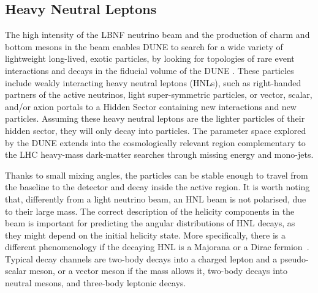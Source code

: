 \subsection{Heavy Neutral Leptons}
The high intensity of the LBNF neutrino beam and the production of charm and bottom mesons in the beam enables DUNE to search for a wide variety of lightweight long-lived, exotic particles, by looking for topologies of rare event interactions and decays in the fiducial volume of the DUNE . These particles include weakly interacting heavy neutral leptons (HNLs), such as right-handed partners of the active neutrinos, light super-symmetric particles, or vector, scalar, and/or axion portals to a Hidden Sector containing new interactions and new particles. 
Assuming these heavy neutral leptons are the lighter particles of their hidden sector, they will only decay into  particles. The parameter space explored by the DUNE  extends into the cosmologically relevant region complementary to the LHC heavy-mass dark-matter searches through missing energy and mono-jets.

Thanks to small mixing angles, the particles can be stable enough to travel from the baseline to the detector and decay inside the active region.
It is worth noting that, differently from a light neutrino beam, an HNL beam is not polarised, due to their large mass.
The correct description of the helicity components in the beam is important for predicting the angular distributions
of HNL decays, as they might depend on the initial helicity state.
More specifically, there is a different phenomenology if the decaying HNL is a Majorana or a Dirac fermion~\cite{Balantekin:2018ukw, Ballett:2019bgd}.
Typical decay channels are two-body decays into a charged lepton and a pseudo-scalar meson, or a vector meson if
the mass allows it, two-body decays into neutral mesons, and three-body leptonic decays.


